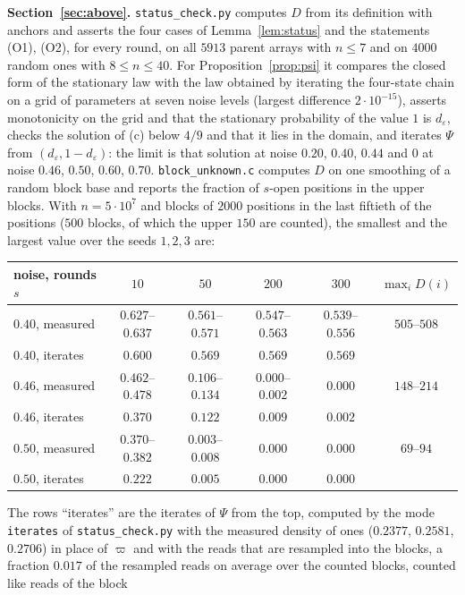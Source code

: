 \documentclass[11pt]{amsart}
\theoremstyle{definition}
\theoremstyle{remark}
\newcommand{\eps}{\varepsilon}
\begin{document}
\medskip\noindent\textbf{Section~\ref{sec:above}.} \texttt{status\_check.py} computes $D$ from its
definition with anchors and asserts the four cases of Lemma~\ref{lem:status} and the statements
(O1), (O2), for every round, on all $5913$ parent arrays with $n\le7$ and on $4000$ random ones
with $8\le n\le40$. For Proposition~\ref{prop:psi} it compares the closed form of the stationary
law with the law obtained by iterating the four-state chain on a grid of parameters at seven
noise levels (largest difference $2\cdot10^{-15}$), asserts monotonicity on the grid and that
the stationary probability of the value $1$ is $d_\eps$, checks the solution of (c) below $4/9$
and that it lies in the domain, and iterates $\Psi$ from $(d_\eps,1-d_\eps)$: the limit is that
solution at noise $0.20$, $0.40$, $0.44$ and $0$ at noise $0.46$, $0.50$, $0.60$, $0.70$.
\texttt{block\_unknown.c} computes $D$ on one smoothing of a random block base and reports the
fraction of $s$-open positions in the upper blocks. With $n=5\cdot10^7$ and blocks of $2000$
positions in the last fiftieth of the positions ($500$ blocks, of which the upper $150$ are
counted), the smallest and the largest value over the seeds $1,2,3$ are:
\begin{center}
\begin{tabular}{lccccc}
\toprule
noise, rounds $s$ & $10$ & $50$ & $200$ & $300$ & $\max_iD(i)$\\
\midrule
$0.40$, measured & $0.627$--$0.637$ & $0.561$--$0.571$ & $0.547$--$0.563$ & $0.539$--$0.556$ & $505$--$508$\\
$0.40$, iterates & $0.600$ & $0.569$ & $0.569$ & $0.569$ & \\
$0.46$, measured & $0.462$--$0.478$ & $0.106$--$0.134$ & $0.000$--$0.002$ & $0.000$ & $148$--$214$\\
$0.46$, iterates & $0.370$ & $0.122$ & $0.009$ & $0.002$ & \\
$0.50$, measured & $0.370$--$0.382$ & $0.003$--$0.008$ & $0.000$ & $0.000$ & $69$--$94$\\
$0.50$, iterates & $0.222$ & $0.005$ & $0.000$ & $0.000$ & \\
\bottomrule
\end{tabular}
\end{center}
The rows ``iterates'' are the iterates of $\Psi$ from the top, computed by the mode
\texttt{iterates} of \texttt{status\_check.py} with the measured density of ones ($0.2377$, $0.2581$,
$0.2706$) in place of $\varpi$ and with the reads that are resampled into the blocks, a fraction
$0.017$ of the resampled reads on average over the counted blocks, counted like reads of the block
\end{document}
